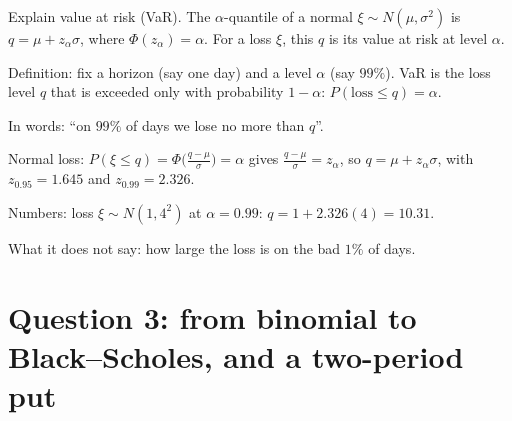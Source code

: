 \begin{problem}[Q2(e)]
Explain value at risk (VaR).
\cardsays The $\alpha$-quantile of a normal $\xi\sim N(\mu,\sigma^2)$ is $q=\mu+z_\alpha\sigma$, where $\Phi(z_\alpha)=\alpha$. For a loss $\xi$, this $q$ is its value at risk at level $\alpha$.
\working
\begin{steps}
\item Definition: fix a horizon (say one day) and a level $\alpha$ (say $99\%$). VaR is the loss level $q$ that is exceeded only with probability $1-\alpha$: $P(\text{loss}\le q)=\alpha$.
\item In words: ``on $99\%$ of days we lose no more than $q$''.
\item Normal loss: $P(\xi\le q)=\Phi\big(\frac{q-\mu}\sigma\big)=\alpha$ gives $\frac{q-\mu}\sigma=z_\alpha$, so $q=\mu+z_\alpha\sigma$, with $z_{0.95}=1.645$ and $z_{0.99}=2.326$.
\item Numbers: loss $\xi\sim N(1,4^2)$ at $\alpha=0.99$: $q=1+2.326(4)=10.31$.
\item What it does not say: how large the loss is on the bad $1\%$ of days.
\end{steps}
\end{problem}

\section{Question 3: from binomial to Black--Scholes, and a two-period put}

